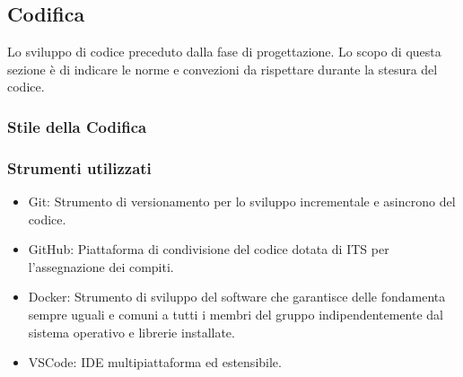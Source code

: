 \subsection{Codifica}

Lo sviluppo di codice preceduto dalla fase di progettazione.
Lo scopo di questa sezione è di indicare le norme e convezioni da rispettare durante la stesura del codice.

\subsubsection{Stile della Codifica}

\subsubsection{Strumenti utilizzati}
    \begin{itemize}
    \item Git: Strumento di versionamento per lo sviluppo incrementale e asincrono del codice.
    \item GitHub: Piattaforma di condivisione del codice dotata di ITS per l'assegnazione dei compiti.
    \item Docker: Strumento di sviluppo del software che garantisce delle fondamenta sempre uguali
      e comuni a tutti i membri del gruppo indipendentemente dal sistema operativo e librerie installate.
    \item VSCode: IDE multipiattaforma ed estensibile.
    \end{itemize}
